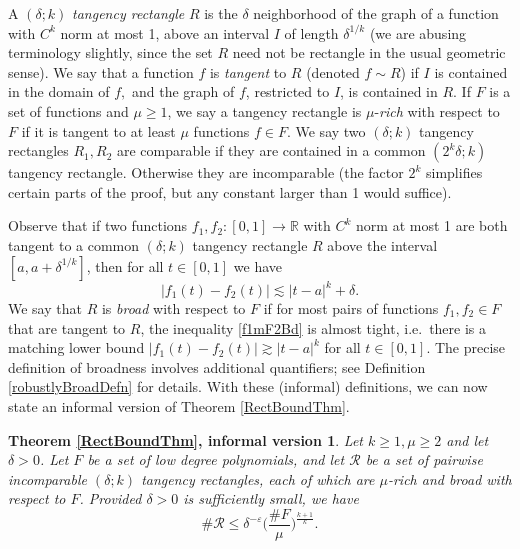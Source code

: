 \documentclass[letterpaper, reqno,11pt]{article}
\numberwithin{equation}{section}
\newcommand{\RR}{\mathbb{R}}
\newcommand{\eps}{\varepsilon}
\numberwithin{thm}{section}
\newtheorem*{RectBoundThmInformal}{Theorem \ref{RectBoundThm}, informal version}
\theoremstyle{remark}
\begin{document}
A $(\delta;k)$ \emph{tangency rectangle} $R$ is the $\delta$ neighborhood of the graph of a function with $C^k$ norm at most 1, above an interval $I$ of length $\delta^{1/k}$ (we are abusing terminology slightly, since the set $R$ need not be rectangle in the usual geometric sense). We say that a function $f$ is \emph{tangent} to $R$ (denoted $f\sim R$) if $I$ is contained in the domain of $f,$ and the graph of $f$, restricted to $I$, is contained in $R$. If $F$ is a set of functions and $\mu\geq 1$, we say a tangency rectangle is $\mu$-\emph{rich} with respect to $F$ if it is tangent to at least $\mu$ functions $f\in F$. We say two $(\delta;k)$ tangency rectangles $R_1,R_2$ are comparable if they are contained in a common $(2^k\delta;k)$ tangency rectangle. Otherwise they are incomparable (the factor $2^k$ simplifies certain parts of the proof, but any constant larger than 1 would suffice).

Observe that if two functions $f_1,f_2\colon [0,1]\to\RR$ with $C^k$ norm at most 1 are both tangent to a common $(\delta;k)$ tangency rectangle $R$ above the interval $[a, a+\delta^{1/k}]$, then for all $t\in[0,1]$ we have 
\begin{equation}\label{f1mF2Bd}
|f_1(t)-f_2(t)|\lesssim |t-a|^k+\delta.
\end{equation}
We say that $R$ is \emph{broad} with respect to $F$ if for most pairs of functions $f_1,f_2\in F$ that are tangent to $R$, the inequality \eqref{f1mF2Bd} is almost tight, i.e.~there is a matching lower bound $|f_1(t)-f_2(t)|\gtrsim |t-a|^k$ for all $t\in[0,1]$. The precise definition of broadness involves additional quantifiers; see Definition \ref{robustlyBroadDefn} for details. With these (informal) definitions, we can now state an informal version of Theorem \ref{RectBoundThm}.

\begin{RectBoundThmInformal}
Let $k\geq 1,\mu\geq 2$ and let $\delta>0$. Let $F$ be a set of low degree polynomials, and let $\mathcal{R}$ be a set of pairwise incomparable $(\delta;k)$ tangency rectangles, each of which are $\mu$-rich and broad with respect to $F$. Provided $\delta>0$ is sufficiently small, we have
\begin{equation}\label{informalRectBd}
\#\mathcal{R}\leq\delta^{-\eps}\Big(\frac{\#F}{\mu}\Big)^{\frac{k+1}{k}}.
\end{equation}
\end{RectBoundThmInformal}
\end{document}
